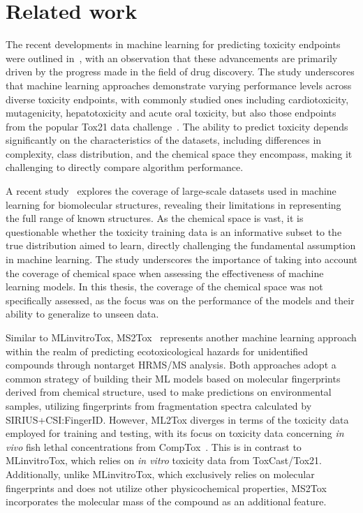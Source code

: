 \chapter{Related work}\label{chap:related_work}

The recent developments in machine learning for predicting toxicity endpoints were outlined in~\cite{cavasotto2022}, with an observation that these advancements are primarily driven by the progress made in the field of drug discovery. The study underscores that machine learning approaches demonstrate varying performance levels across diverse toxicity endpoints, with commonly studied ones including cardiotoxicity, mutagenicity, hepatotoxicity and acute oral toxicity, but also those endpoints from the popular Tox21 data challenge~\cite{richard2021}. The ability to predict toxicity depends significantly on the characteristics of the datasets, including differences in complexity, class distribution, and the chemical space they encompass, making it challenging to directly compare algorithm performance.

A recent study~\cite{kretschmer2023} explores the coverage of large-scale datasets used in machine learning for biomolecular structures, revealing their limitations in representing the full range of known structures. As the chemical space is vast, it is questionable whether the toxicity training data is an informative subset to the true distribution aimed to learn, directly challenging the fundamental assumption in machine learning. The study underscores the importance of taking into account the coverage of chemical space when assessing the effectiveness of machine learning models. In this thesis, the coverage of the chemical space was not specifically assessed, as the focus was on the performance of the models and their ability to generalize to unseen data.

Similar to MLinvitroTox, MS2Tox~\cite{peets2022} represents another machine learning approach within the realm of predicting ecotoxicological hazards for unidentified compounds through nontarget HRMS/MS analysis. Both approaches adopt a common strategy of building their ML models based on molecular fingerprints derived from chemical structure, used to make predictions on environmental samples, utilizing fingerprints from fragmentation spectra calculated by SIRIUS+CSI:FingerID. However, ML2Tox diverges in terms of the toxicity data employed for training and testing, with its focus on toxicity data concerning \emph{in vivo} fish lethal concentrations from CompTox~\cite{williams2017}. This is in contrast to MLinvitroTox, which relies on \emph{in vitro} toxicity data from ToxCast/Tox21. Additionally, unlike MLinvitroTox, which exclusively relies on molecular fingerprints and does not utilize other physicochemical properties, MS2Tox incorporates the molecular mass of the compound as an additional feature.


